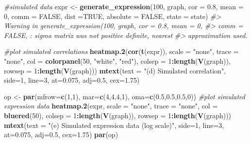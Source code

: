 \documentclass[]{article}
\newenvironment{Shaded}{\begin{snugshade}}{\end{snugshade}}
\newcommand{\CommentTok}[1]{\textcolor[rgb]{0.56,0.35,0.01}{\textit{#1}}}
\newcommand{\DataTypeTok}[1]{\textcolor[rgb]{0.13,0.29,0.53}{#1}}
\newcommand{\DecValTok}[1]{\textcolor[rgb]{0.00,0.00,0.81}{#1}}
\newcommand{\FloatTok}[1]{\textcolor[rgb]{0.00,0.00,0.81}{#1}}
\newcommand{\KeywordTok}[1]{\textcolor[rgb]{0.13,0.29,0.53}{\textbf{#1}}}
\newcommand{\NormalTok}[1]{#1}
\newcommand{\OperatorTok}[1]{\textcolor[rgb]{0.81,0.36,0.00}{\textbf{#1}}}
\newcommand{\OtherTok}[1]{\textcolor[rgb]{0.56,0.35,0.01}{#1}}
\newcommand{\StringTok}[1]{\textcolor[rgb]{0.31,0.60,0.02}{#1}}
\begin{document}
\begin{Shaded}
\begin{Highlighting}[]
\CommentTok{#simulated data}
\NormalTok{expr <-}\StringTok{ }\KeywordTok{generate_expression}\NormalTok{(}\DecValTok{100}\NormalTok{, graph, }\DataTypeTok{cor =} \FloatTok{0.8}\NormalTok{, }\DataTypeTok{mean =} \DecValTok{0}\NormalTok{,}
\DataTypeTok{comm =} \OtherTok{FALSE}\NormalTok{, }\DataTypeTok{dist =}\OtherTok{TRUE}\NormalTok{, }\DataTypeTok{absolute =} \OtherTok{FALSE}\NormalTok{, }\DataTypeTok{state =}\NormalTok{ state)}
\CommentTok{#> Warning in generate_expression(100, graph, cor = 0.8, mean = 0,}
\CommentTok{#> comm = FALSE, : sigma matrix was not positive definite, nearest}
\CommentTok{#> approximation used.}

\CommentTok{#plot simulated correlations}
\KeywordTok{heatmap.2}\NormalTok{(}\KeywordTok{cor}\NormalTok{(}\KeywordTok{t}\NormalTok{(expr)), }\DataTypeTok{scale =} \StringTok{"none"}\NormalTok{, }\DataTypeTok{trace =} \StringTok{"none"}\NormalTok{, }\DataTypeTok{col =} \KeywordTok{colorpanel}\NormalTok{(}\DecValTok{50}\NormalTok{, }\StringTok{"white"}\NormalTok{, }\StringTok{"red"}\NormalTok{),}
\DataTypeTok{colsep =} \DecValTok{1}\OperatorTok{:}\KeywordTok{length}\NormalTok{(}\KeywordTok{V}\NormalTok{(graph)), }\DataTypeTok{rowsep =} \DecValTok{1}\OperatorTok{:}\KeywordTok{length}\NormalTok{(}\KeywordTok{V}\NormalTok{(graph)))}
\KeywordTok{mtext}\NormalTok{(}\DataTypeTok{text =} \StringTok{"(d) Simulated correlation"}\NormalTok{, }\DataTypeTok{side=}\DecValTok{1}\NormalTok{, }\DataTypeTok{line=}\DecValTok{3}\NormalTok{, }\DataTypeTok{at=}\FloatTok{0.075}\NormalTok{, }\DataTypeTok{adj=}\FloatTok{0.5}\NormalTok{, }\DataTypeTok{cex=}\FloatTok{1.75}\NormalTok{)}

\NormalTok{op <-}\StringTok{ }\KeywordTok{par}\NormalTok{(}\DataTypeTok{mfrow=}\KeywordTok{c}\NormalTok{(}\DecValTok{1}\NormalTok{,}\DecValTok{1}\NormalTok{), }\DataTypeTok{mar=}\KeywordTok{c}\NormalTok{(}\DecValTok{4}\NormalTok{,}\DecValTok{4}\NormalTok{,}\DecValTok{4}\NormalTok{,}\DecValTok{1}\NormalTok{), }\DataTypeTok{oma=}\KeywordTok{c}\NormalTok{(}\FloatTok{0.5}\NormalTok{,}\FloatTok{0.5}\NormalTok{,}\FloatTok{0.5}\NormalTok{,}\DecValTok{0}\NormalTok{))}
\CommentTok{#plot simulated expression data}
\KeywordTok{heatmap.2}\NormalTok{(expr, }\DataTypeTok{scale =} \StringTok{"none"}\NormalTok{, }\DataTypeTok{trace =} \StringTok{"none"}\NormalTok{, }\DataTypeTok{col =} \KeywordTok{bluered}\NormalTok{(}\DecValTok{50}\NormalTok{),}
\DataTypeTok{colsep =} \DecValTok{1}\OperatorTok{:}\KeywordTok{length}\NormalTok{(}\KeywordTok{V}\NormalTok{(graph)), }\DataTypeTok{rowsep =} \DecValTok{1}\OperatorTok{:}\KeywordTok{length}\NormalTok{(}\KeywordTok{V}\NormalTok{(graph)))}
\KeywordTok{mtext}\NormalTok{(}\DataTypeTok{text =} \StringTok{"(e) Simulated expression data (log scale)"}\NormalTok{, }\DataTypeTok{side=}\DecValTok{1}\NormalTok{, }\DataTypeTok{line=}\DecValTok{3}\NormalTok{, }\DataTypeTok{at=}\FloatTok{0.075}\NormalTok{, }\DataTypeTok{adj=}\FloatTok{0.5}\NormalTok{, }\DataTypeTok{cex=}\FloatTok{1.75}\NormalTok{)}
\KeywordTok{par}\NormalTok{(op)}
\end{Highlighting}
\end{Shaded}
\end{document}
